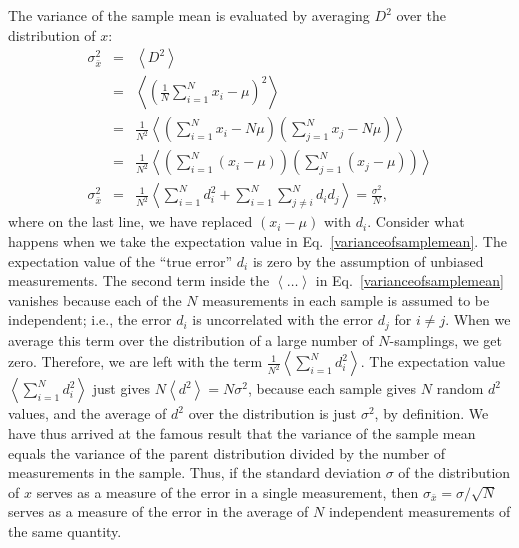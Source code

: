 \documentclass{revtex4}
\begin{document}
The variance of the sample mean is evaluated by averaging $D^2$ over
the distribution of $x$:
\begin{eqnarray}
  \sigma^2_{\bar{x}} &=& \left<D^2\right> \nonumber \\
  &=& \left<\left(\frac{1}{N} \sum_{i=1}^N x_i - \mu\right)^2\right>
  \nonumber \\
  &=& \frac{1}{N^2}\left<\left(\sum_{i=1}^N x_i - N\mu \right)\left(\sum_{j=1}^N
      x_j - N\mu \right)\right> \nonumber \\
  &=& \frac{1}{N^2} \left<\left(\sum_{i=1}^N (x_i - \mu) \right)\left(\sum_{j=1}^N
      (x_j - \mu) \right) \right>\nonumber \\
  \sigma^2_{\bar{x}} &=& \frac{1}{N^2} \left<\sum_{i=1}^N d_i^2 +
    \sum_{i=1}^N \sum_{j \ne i}^N d_i d_j \right>  = \frac{\sigma^2}{N} \label{varianceofsamplemean},
\end{eqnarray}
where on the last line, we have replaced $(x_i - \mu)$ with $d_i$. Consider what happens when we take the expectation value in
Eq.~\eqref{varianceofsamplemean}. The expectation value of the ``true
error'' $d_i$ is zero by the assumption of unbiased
measurements. The second term inside the $\left<\ldots \right>$ in
Eq.~\eqref{varianceofsamplemean} vanishes because each of the $N$
measurements in each sample is assumed to be independent; i.e., the
error $d_i$ is uncorrelated with the error $d_j$ for $i \ne
j$. When we average this term over the distribution of a large number
of $N$-samplings, we get zero. Therefore, we are left with the term $\frac{1}{N^2}
\left<\sum_{i=1}^N d_i^2 \right>$. The expectation value
$\left<\sum_{i=1}^N d_i^2\right>$ just gives $N \left<d^2\right> = N
\sigma^2$, because each sample gives $N$ random $d^2$ values, and
the average of $d^2$ over the distribution is just $\sigma^2$, by
definition. We have thus arrived at the famous result that the
variance of the sample mean equals the variance of the parent distribution
divided by the number of measurements in the sample. Thus, if the
standard deviation $\sigma$ of the distribution of $x$ serves as a
measure of the error in a single measurement, then $\sigma_{\bar{x}}
= \sigma/\sqrt{N}$ serves as a measure of the error in the average
of $N$ independent measurements of the same quantity.
\end{document}
